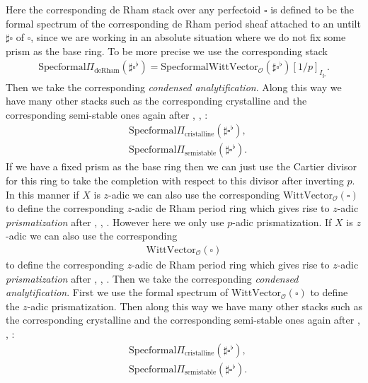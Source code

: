 \documentclass[12pt]{article}
\theoremstyle{definition}
\begin{document}
\indent Here the corresponding de Rham stack over any perfectoid $\square$ is defined to be the formal spectrum of the corresponding de Rham period sheaf attached to an untilt $\sharp\square$ of $\square$, since we are working in an absolute situation where we do not fix some prism as the base ring. To be more precise we use the corresponding stack 
\begin{align}
\mathrm{Specformal}\Pi_\mathrm{deRham}(\sharp\square^\flat)=\mathrm{Specformal}\mathrm{WittVector}_\mathcal{O}(\sharp\square^\flat)[1/p]_{I_{\sharp\square}}. 
\end{align}
Then we take the corresponding \textit{condensed analytification}. Along this way we have many other stacks such as the corresponding crystalline and the corresponding semi-stable ones again after \cite{BS2}, \cite{BLA}, \cite{DC}:
\begin{align}
&\mathrm{Specformal}\Pi_\mathrm{cristalline}(\sharp\square^\flat),\\
&\mathrm{Specformal}\Pi_\mathrm{semistable}(\sharp\square^\flat).
\end{align}
If we have a fixed prism as the base ring then we can just use the Cartier divisor for this ring to take the completion with respect to this divisor after inverting $p$. In this manner if $X$ is $z$-adic we can also use the corresponding $\mathrm{WittVector}_\mathcal{O}(\square)$ to define the corresponding $z$-adic de Rham period ring which gives rise to $z$-adic \textit{prismatization} after \cite{BS2}, \cite{BLA}, \cite{DC}. However here we only use $p$-adic prismatization. If $X$ is $z$-adic we can also use the corresponding
\begin{align}
\mathrm{WittVector}_\mathcal{O}(\square)
\end{align} 
 to define the corresponding $z$-adic de Rham period ring which gives rise to $z$-adic \textit{prismatization} after \cite{BS2}, \cite{BLA}, \cite{DC}. Then we take the corresponding \textit{condensed analytification}. First we use the formal spectrum of $\mathrm{WittVector}_\mathcal{O}(\square)$ to define the $z$-adic prismatization. Then along this way we have many other stacks such as the corresponding crystalline and the corresponding semi-stable ones again after \cite{BS2}, \cite{BLA}, \cite{DC}:
\begin{align}
&\mathrm{Specformal}\Pi_\mathrm{cristalline}(\sharp\square^\flat),\\&\mathrm{Specformal}\Pi_\mathrm{semistable}(\sharp\square^\flat).
\end{align}
\end{document}
